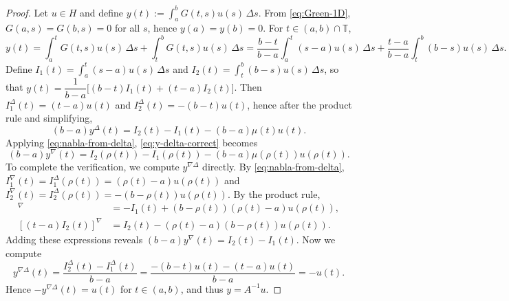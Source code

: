 \documentclass{article}
\numberwithin{equation}{section}
\numberwithin{theorem}{section}
\newcommand{\shalmalirmk}[1]{\textcolor{red}{\textsf{[Shalmali: #1]}}}
\begin{document}
\begin{proof}
Let $u \in H$ and define $y(t) := \displaystyle\int_a^b G(t,s) u(s) \, \Delta s$. From \eqref{eq:Green-1D}, $G(a,s)=G(b,s)=0$ for all $s$, hence $y(a)=y(b)=0$. For $t\in(a,b)\cap\mathbb{T}$,
$$y(t) = \int_a^t G(t,s)u(s)\,\Delta s + \int_t^b G(t,s)u(s)\,\Delta s = \frac{b-t}{b-a}\int_a^t (s-a)u(s)\,\Delta s + \frac{t-a}{b-a}\int_t^b (b-s)u(s)\,\Delta s.$$
Define $I_1(t)=\displaystyle\int_a^t (s-a)u(s)\,\Delta s$ and $I_2(t)=\displaystyle\int_t^b (b-s)u(s)\,\Delta s$, so that $y(t)=\dfrac{1}{b-a}\Big[(b-t)I_1(t)+(t-a)I_2(t)\Big]$. Then $I_1^\Delta(t)=(t-a)u(t)$ and $I_2^\Delta(t)=-(b-t)u(t)$, hence after the product rule and simplifying,
\begin{equation}\label{eq:y-delta-correct}
(b-a)y^\Delta(t)=I_2(t)-I_1(t)-(b-a)\mu(t)u(t).
\end{equation}
Applying \eqref{eq:nabla-from-delta}, \eqref{eq:y-delta-correct} becomes
$$(b-a)y^\nabla(t) = I_2(\rho(t))-I_1(\rho(t))-(b-a)\mu(\rho(t))u(\rho(t)).$$
To complete the verification, we compute $y^{\nabla\Delta}$ directly. By \eqref{eq:nabla-from-delta}, $I_1^\nabla(t) = I_1^\Delta(\rho(t)) = (\rho(t)-a)u(\rho(t))$ and $I_2^\nabla(t) = I_2^\Delta(\rho(t)) = -(b-\rho(t))u(\rho(t))$. By the product rule,
\begin{align*}
[(b-t)I_1(t)]^\nabla &= -I_1(t) + (b-\rho(t))(\rho(t)-a)u(\rho(t)), \\
[(t-a)I_2(t)]^\nabla &= I_2(t) - (\rho(t)-a)(b-\rho(t))u(\rho(t)).
\end{align*}
Adding these expressions reveals $(b-a)y^\nabla(t) = I_2(t) - I_1(t)$. Now we compute
\[y^{\nabla\Delta}(t) = \dfrac{I_2^\Delta(t) - I_1^\Delta(t)}{b-a}=\frac{-(b-t)u(t) - (t-a)u(t)}{b-a}=-u(t).\]
Hence $-y^{\nabla\Delta}(t) = u(t)$ for $t \in (a,b)$, and thus $y = A^{-1}u$.

\end{proof}
\end{document}
